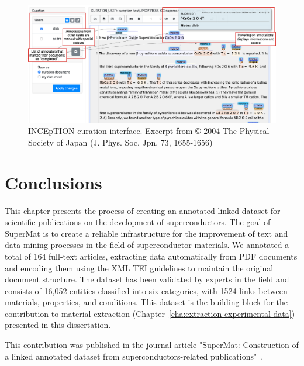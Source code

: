 \begin{figure}[htbp]
    \centering
    \includegraphics[width=\linewidth]{figures/supermat/Fig7.png}
    \caption{INCEpTION curation interface. Excerpt from © 2004 The Physical Society of Japan (J. Phys. Soc. Jpn. 73, 1655-1656)}
    \label{fig:inception-curation-interface}
\end{figure}


\section{Conclusions}
This chapter presents the process of creating an annotated linked dataset for scientific publications on the development of superconductors. The goal of SuperMat is to create a reliable infrastructure for the improvement of text and data mining processes in the field of superconductor materials. We annotated a total of 164 full-text articles, extracting data automatically from PDF documents and encoding them using the XML TEI guidelines to maintain the original document structure. The dataset has been validated by experts in the field and consists of 16,052 entities classified into six categories, with 1524 links between materials, properties, and conditions.
This dataset is the building block for the contribution to material extraction (Chapter~\ref{cha:extraction-experimental-data}) presented in this dissertation. 

This contribution was published in the journal article "SuperMat: Construction of a linked annotated dataset from superconductors-related publications"~\cite{foppiano2021supermat}. 










